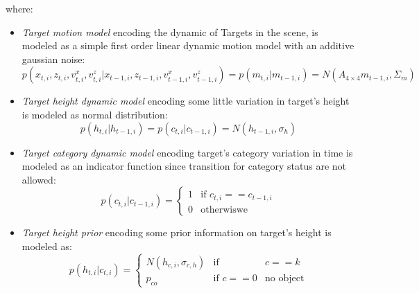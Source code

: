 where:
\begin{itemize}
\item \textit{Target motion model} encoding the dynamic of Targets in the scene, is modeled as a simple first order linear dynamic motion model with an additive gaussian noise:
$$
p(x_{t,i}, z_{t,i}, v_{t,i}^x,v_{t,i}^z | x_{t-1,i}, z_{t-1,i}, v_{t-1,i}^x,v_{t-1,i}^z)=
p(m_{t,i} | m_{t-1,i})=N(A_{4\times4} m_{t-1,i} , \Sigma_m )
$$
\item \textit{Target height dynamic model} encoding some little variation in target's height is modeled as normal distribution:
$$
p(h_{t,i} |h_{t-1,i}) =
 p(c_{t,i} |c_{t-1,i})= N(h_{t-1,i} , \sigma_h ) 
$$
\item \textit{Target category dynamic model} encoding  target's category variation in time is modeled as an indicator function since transition for category status are not allowed:
$$
 p(c_{t,i} |c_{t-1,i})= \left\{
\begin{array}{rl}
1 & \mbox{if }  c_{t,i}==c_{t-1,i} \\
0 & \mbox{otherwiswe } 
\end{array}
\right.
$$

\item \textit{Target height prior} encoding some prior information on target's height is  modeled as:
$$
 p(h_{t,i} |c_{t,i})= \left\{
\begin{array}{rcl}
 N(h_{c,i} , \sigma_{c,h} )  & \mbox{if } & c==k \\
 p_{co} & \mbox{if }  c==0  & \mbox{no object}
\end{array}
\right.
$$
\end{itemize}

